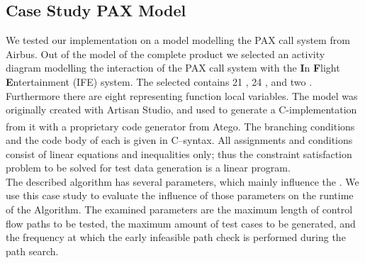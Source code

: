 \subsection{Case Study PAX Model}
\label{sec:evaluationCaseStudy}
We tested our implementation on a model modelling the PAX call system from Airbus. Out of the model of the complete product we selected an activity diagram modelling the interaction of the PAX call system with the \textbf{I}n \textbf{F}light \textbf{E}ntertainment (IFE) system. The selected  contains 21 , 24 , and two . Furthermore there are eight  representing function local variables. The model was originally created with Artisan Studio, and used to generate a C-implementation from it with a proprietary code generator from Atego\textsuperscript{\textregistered}. The branching conditions and the code body of each  is given in C--syntax. All assignments and conditions consist of linear equations and inequalities only; thus the constraint satisfaction problem to be solved for test data generation is a linear program.\\
The described algorithm has several parameters, which mainly influence the . We use this case study to evaluate the influence of those parameters on the runtime of the Algorithm. The examined parameters are the maximum length of control flow paths to be tested, the maximum amount of test cases to be generated, and the frequency at which the early infeasible path check is performed during the path search.
